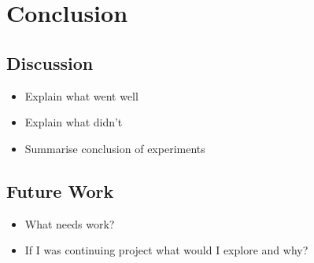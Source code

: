 \chapter{Conclusion}

\section{Discussion}
\begin{itemize}
	\item Explain what went well
	\item Explain what didn't
	\item Summarise conclusion of experiments
\end{itemize}

\section{Future Work}
\begin{itemize}
	\item What needs work?
	\item If I was continuing project what would I explore and why?
\end{itemize}